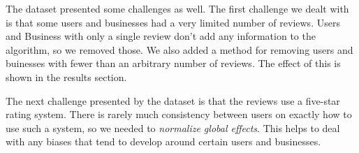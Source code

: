 The dataset presented some challenges as well. The first challenge we dealt with
is that some users and businesses had a very limited number of reviews. Users
and Business with only a single review don't add any information to the
algorithm, so we removed those. We also added a method for removing users and
buinesses with fewer than an arbitrary number of reviews. The effect of this is
shown in the results section.

The next challenge presented by the dataset is that the reviews use a five-star
rating system. There is rarely much consistency between users on exactly how to
use such a system, so we needed to \emph{normalize global effects}. This helps
to deal with any biases that tend to develop around certain users and
businesses. 

